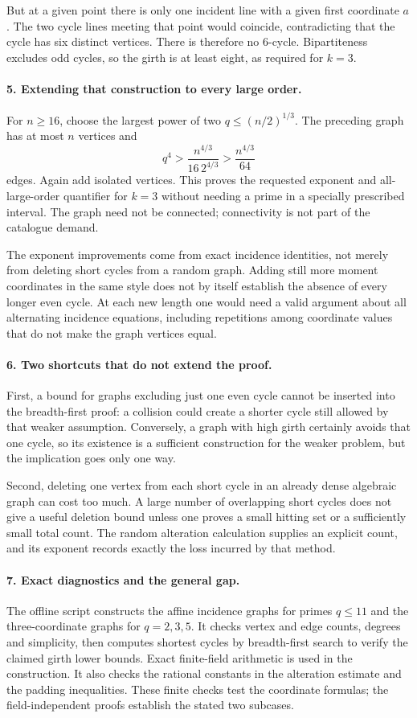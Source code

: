 \documentclass[11pt]{article}
\begin{document}
But at a given point there is only one incident line with a given first coordinate $a$. The two cycle lines meeting that point would coincide, contradicting that the cycle has six distinct vertices. There is therefore no 6-cycle. Bipartiteness excludes odd cycles, so the girth is at least eight, as required for $k=3$.

\paragraph{5. Extending that construction to every large order.}
For $n\ge16$, choose the largest power of two $q\le(n/2)^{1/3}$. The preceding graph has at most $n$ vertices and
\[
 q^4>\frac{n^{4/3}}{16\,2^{4/3}}>\frac{n^{4/3}}{64}
\]
edges. Again add isolated vertices. This proves the requested exponent and all-large-order quantifier for $k=3$ without needing a prime in a specially prescribed interval. The graph need not be connected; connectivity is not part of the catalogue demand.

The exponent improvements come from exact incidence identities, not merely from deleting short cycles from a random graph. Adding still more moment coordinates in the same style does not by itself establish the absence of every longer even cycle. At each new length one would need a valid argument about all alternating incidence equations, including repetitions among coordinate values that do not make the graph vertices equal.

\paragraph{6. Two shortcuts that do not extend the proof.}
First, a bound for graphs excluding just one even cycle cannot be inserted into the breadth-first proof: a collision could create a shorter cycle still allowed by that weaker assumption. Conversely, a graph with high girth certainly avoids that one cycle, so its existence is a sufficient construction for the weaker problem, but the implication goes only one way.

Second, deleting one vertex from each short cycle in an already dense algebraic graph can cost too much. A large number of overlapping short cycles does not give a useful deletion bound unless one proves a small hitting set or a sufficiently small total count. The random alteration calculation supplies an explicit count, and its exponent records exactly the loss incurred by that method.

\paragraph{7. Exact diagnostics and the general gap.}
The offline script constructs the affine incidence graphs for primes $q\le11$ and the three-coordinate graphs for $q=2,3,5$. It checks vertex and edge counts, degrees and simplicity, then computes shortest cycles by breadth-first search to verify the claimed girth lower bounds. Exact finite-field arithmetic is used in the construction. It also checks the rational constants in the alteration estimate and the padding inequalities. These finite checks test the coordinate formulas; the field-independent proofs establish the stated two subcases.
\end{document}
